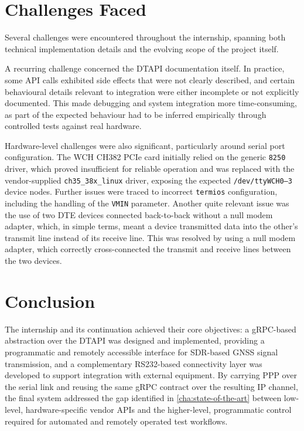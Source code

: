 \section{Challenges Faced}

Several challenges were encountered throughout the internship, spanning both
technical implementation details and the evolving scope of the project
itself.

A recurring challenge concerned the \gls{DTAPI} documentation itself.
In practice, some API calls exhibited side effects that were not clearly
described, and certain behavioural details relevant to integration were either
incomplete or not explicitly documented. This made debugging and system
integration more time-consuming, as part of the expected behaviour had to be
inferred empirically through controlled tests against real hardware.

Hardware-level challenges were also significant, particularly around serial
port configuration. The WCH CH382 PCIe card initially relied on the generic
\texttt{8250} driver, which proved insufficient for reliable operation and
was replaced with the vendor-supplied \texttt{ch35\_38x\_linux} driver,
exposing the expected \texttt{/dev/ttyWCH0--3} device nodes. Further issues
were traced to incorrect \texttt{termios} configuration, including the
handling of the \texttt{VMIN} parameter. Another quite relevant issue was the
use of two \gls{DTE} devices connected back-to-back without a null modem adapter, which, in simple terms,
meant a device transmitted data into the other's transmit line instead of its receive line. 
This was resolved by using a null modem adapter, which correctly cross-connected
the transmit and receive lines between the two devices.

\section{Conclusion}

The internship and its continuation achieved their core objectives: a
\gls{gRPC}-based abstraction over the \gls{DTAPI} was designed and
implemented, providing a programmatic and remotely accessible interface for
\gls{SDR}-based \gls{GNSS} signal transmission, and a complementary
\gls{RS232}-based connectivity layer was developed to support integration with
external equipment. By carrying \gls{PPP} over the serial link and reusing the
same gRPC contract over the resulting IP channel, the final system addressed
the gap identified in \autoref{cha:state-of-the-art} between low-level,
hardware-specific vendor APIs and the higher-level, programmatic control
required for automated and remotely operated test workflows.

